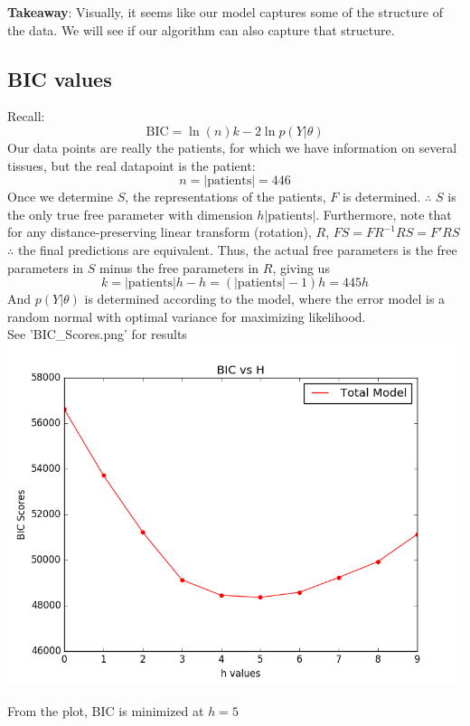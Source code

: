 \documentclass{article}
\newcommand{\tx}[1]{\text{#1}}
\begin{document}
{\bf Takeaway}: Visually, it seems like our model captures some of the structure of the data. We will see if our algorithm can also capture that structure. \\

\subsection{BIC values}
Recall:
\[ \tx{BIC} = \ln(n)k - 2 \ln p(Y | \theta) \]
Our data points are really the patients, for which we have information on several tissues, but the real datapoint is the patient:
\[ n = |\tx{patients}| = 446 \]
Once we determine $S$, the representations of the patients, $F$ is determined. $\therefore$ $S$ is the only true free parameter with dimension $h|\tx{patients}|$. Furthermore, note that for any distance-preserving linear transform (rotation), $R$, $FS = FR^{-1}RS = F' RS$ $\therefore$ the final predictions are equivalent. Thus, the actual free parameters is the free parameters in $S$ minus the free parameters in $R$, giving us
\[ k = |\tx{patients}|h - h = (|\tx{patients}|-1)h  = 445h\]
And $p(Y | \theta)$ is determined according to the model, where the error model is a random normal with optimal variance for maximizing likelihood. \\
See 'BIC\_Scores.png' for results \\
\includegraphics[scale = 0.6]{BIC_Scores.png}

From the plot, BIC is minimized at $h = 5$
\end{document}
